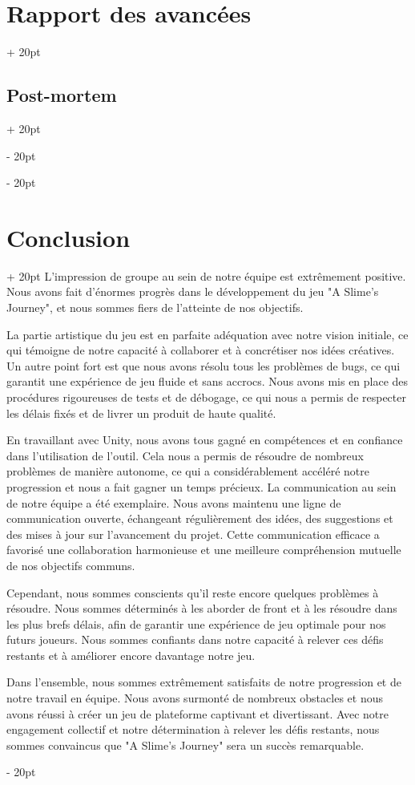 \documentclass[a4paper, 12pt, twoside]{article}
\newcommand{\ind}[1][20pt]{\advance\leftskip + #1}
\newcommand{\deind}[1][20pt]{\advance\leftskip - #1}
\newenvironment{indt}[2][20pt]{#2 \par \ind[#1]}{\par \deind} %
\begin{document}
\begin{indt}{\section{Rapport des avancées}}
\begin{indt}{\subsection{Post-mortem}}
        \end{indt}
    \end{indt}

    \newpage

    \begin{indt}{\section{Conclusion}}
        L'impression de groupe au sein de notre équipe est extrêmement positive. Nous avons fait d'énormes progrès dans le développement du jeu "A Slime's Journey", et nous sommes fiers de l'atteinte de nos objectifs.

        La partie artistique du jeu est en parfaite adéquation avec notre vision initiale, ce qui témoigne de notre capacité à collaborer et à concrétiser nos idées créatives.
        Un autre point fort est que nous avons résolu tous les problèmes de bugs, ce qui garantit une expérience de jeu fluide et sans accrocs. Nous avons mis en place des procédures rigoureuses de tests et de débogage, ce qui nous a permis de respecter les délais fixés et de livrer un produit de haute qualité.

        En travaillant avec Unity, nous avons tous gagné en compétences et en confiance dans l'utilisation de l'outil. Cela nous a permis de résoudre de nombreux problèmes de manière autonome, ce qui a considérablement accéléré notre progression et nous a fait gagner un temps précieux.
        La communication au sein de notre équipe a été exemplaire. Nous avons maintenu une ligne de communication ouverte, échangeant régulièrement des idées, des suggestions et des mises à jour sur l'avancement du projet. Cette communication efficace a favorisé une collaboration harmonieuse et une meilleure compréhension mutuelle de nos objectifs communs.

        Cependant, nous sommes conscients qu'il reste encore quelques problèmes à résoudre. Nous sommes déterminés à les aborder de front et à les résoudre dans les plus brefs délais, afin de garantir une expérience de jeu optimale pour nos futurs joueurs. Nous sommes confiants dans notre capacité à relever ces défis restants et à améliorer encore davantage notre jeu.

        Dans l'ensemble, nous sommes extrêmement satisfaits de notre progression et de notre travail en équipe. Nous avons surmonté de nombreux obstacles et nous avons réussi à créer un jeu de plateforme captivant et divertissant. Avec notre engagement collectif et notre détermination à relever les défis restants, nous sommes convaincus que "A Slime's Journey" sera un succès remarquable.


\end{indt}
\end{document}
